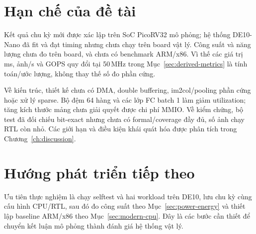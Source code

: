 \section{Hạn chế của đề tài}
Kết quả chu kỳ mới được xác lập trên SoC PicoRV32 mô phỏng; hệ thống DE10-Nano đã fit và đạt timing nhưng chưa chạy trên board vật lý. Công suất và năng lượng chưa đo trên board, và chưa có benchmark ARM/x86. Vì thế các giá trị ms, ảnh/s và GOPS quy đổi tại 50\,MHz trong Mục~\ref{sec:derived-metrics} là tính toán/ước lượng, không thay thế số đo phần cứng.

Về kiến trúc, thiết kế chưa có DMA, double buffering, im2col/pooling phần cứng hoặc xử lý sparse. Bộ đệm 64 hàng và các lớp FC batch 1 làm giảm utilization; tăng kích thước mảng chưa giải quyết được chi phí MMIO. Về kiểm chứng, bộ test đã đối chiếu bit-exact nhưng chưa có formal/coverage đầy đủ, số ảnh chạy RTL còn nhỏ. Các giới hạn và điều kiện khái quát hóa được phân tích trong Chương~\ref{ch:discussion}.

\section{Hướng phát triển tiếp theo}
Ưu tiên thực nghiệm là chạy selftest và hai workload trên DE10, lưu chu kỳ cùng cấu hình CPU/RTL, sau đó đo công suất theo Mục~\ref{sec:power-energy} và thiết lập baseline ARM/x86 theo Mục~\ref{sec:modern-cpu}. Đây là các bước cần thiết để chuyển kết luận mô phỏng thành đánh giá hệ thống vật lý.

